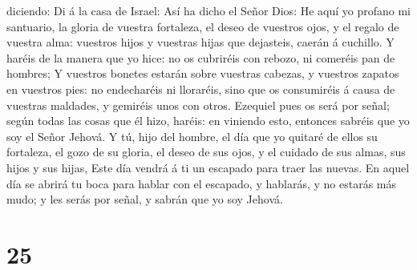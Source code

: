 diciendo:  Di á la casa de Israel: Así ha dicho el Señor
Dios: He aquí yo profano mi santuario, la gloria de vuestra fortaleza,
el deseo de vuestros ojos, y el regalo de vuestra alma: vuestros hijos y
vuestras hijas que dejasteis, caerán á cuchillo.  Y
haréis de la manera que yo hice: no os cubriréis con rebozo, ni comeréis
pan de hombres;  Y vuestros bonetes estarán sobre
vuestras cabezas, y vuestros zapatos en vuestros pies: no endecharéis ni
lloraréis, sino que os consumiréis á causa de vuestras maldades, y
gemiréis unos con otros.  Ezequiel pues os será por
señal; según todas las cosas que él hizo, haréis: en viniendo esto,
entonces sabréis que yo soy el Señor Jehová.  Y tú, hijo
del hombre, el día que yo quitaré de ellos su fortaleza, el gozo de su
gloria, el deseo de sus ojos, y el cuidado de sus almas, sus hijos y sus
hijas,  Este día vendrá á ti un escapado para traer las
nuevas.  En aquel día se abrirá tu boca para hablar con
el escapado, y hablarás, y no estarás más mudo; y les serás por señal, y
sabrán que yo soy Jehová.

\hypertarget{section-24}{%
\section{25}\label{section-24}}

